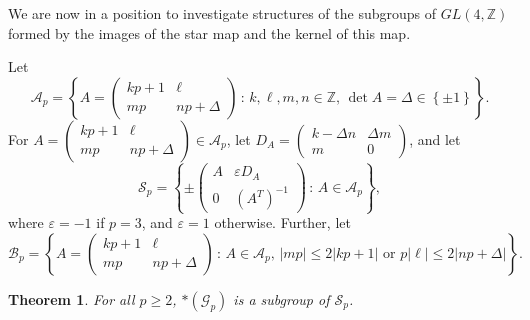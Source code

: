 \documentclass{amsart}     %
\newcommand{\set}[1]{ \left\{ #1 \right\} }
\newtheorem{thm}{Theorem}[section]    %
\theoremstyle{definition}
\begin{document}
We are now in a position to investigate structures of the subgroups of $GL(4, \mathbb{Z})$ formed by the images of the star map and the kernel of this map.

Let \[\mathcal{A}_p = \set{ A = \begin{pmatrix} kp+1 & \ell \\ mp & np + \Delta \end{pmatrix} \, :  \,  k, \ell, m, n \in \mathbb{Z}, \, \det A = \Delta \in \set{\pm 1}}.\] For $A = \begin{pmatrix} kp+1 & \ell \\ mp & np + \Delta \end{pmatrix}  \in \mathcal{A}_p$, let $D_A = \begin{pmatrix} k - \Delta n & \Delta m \\ m & 0 \end{pmatrix}$, and let \[\mathcal{S}_p = \set{ \pm \begin{pmatrix} A & \varepsilon D_A \\ 0 & (A^{T})^{-1} \end{pmatrix} \, : \, A \in \mathcal{A}_p},\] where $\varepsilon = -1$ if $p = 3$, and $\varepsilon = 1$ otherwise. Further, let \[\mathcal{B}_p = \set{ A = \begin{pmatrix} kp+1 & \ell \\ mp & np + \Delta \end{pmatrix} \, :  \, A \in \mathcal{A}_p, \, |mp | \leq 2|kp + 1| \mbox{ or } p| \ell |  \leq  2 | np + \Delta |}.\] 


\begin{thm} \label{thm:subgroups} For all $p \geq 2$, $*(\mathcal{G}_p)$ is a subgroup of $\mathcal{S}_p$. 
\end{thm}
\end{document}
